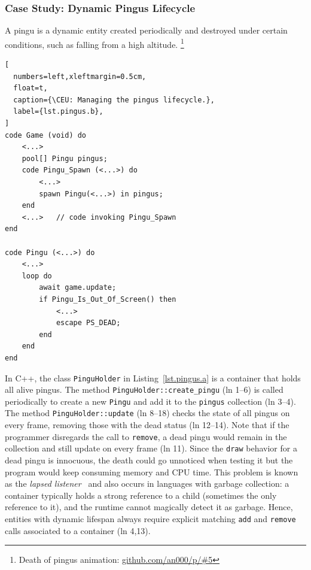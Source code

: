 \documentclass[10pt, conference, compsocconf]{IEEEtran}
\newcommand{\CEU}{\textsc{C\'{e}u}\xspace}
\newcommand{\code}[1] {{\small{\texttt{#1}}}}
\begin{document}
\subsubsection{Case Study: Dynamic Pingus Lifecycle}
\label{sec.pats.lifespan.2}


A pingu is a dynamic entity created periodically and destroyed under certain
conditions, such as falling from a high altitude.%
\footnote{Death of pingus animation: \url{github.com/an000/p/#5} }
%

\begin{lstlisting}[
  numbers=left,xleftmargin=0.5cm,
  float=t,
  caption={\CEU: Managing the pingus lifecycle.},
  label={lst.pingus.b},
]
code Game (void) do
    <...>
    pool[] Pingu pingus;
    code Pingu_Spawn (<...>) do
        <...>
        spawn Pingu(<...>) in pingus;
    end
    <...>   // code invoking Pingu_Spawn
end

code Pingu (<...>) do
    <...>
    loop do
        await game.update;
        if Pingu_Is_Out_Of_Screen() then
            <...>
            escape PS_DEAD;
        end
    end
end
\end{lstlisting}

In C++, the class \code{PinguHolder} in Listing~\ref{lst.pingus.a} is a
container that holds all alive pingus.
%
The method \code{PinguHolder::create\_pingu} (ln 1--6) is called periodically
to create a new \code{Pingu} and add it to the \code{pingus} collection
(ln 3--4).
The method \code{PinguHolder::update} (ln 8--18) checks the state of all
pingus on every frame, removing those with the dead status (ln 12--14).
%
Note that if the programmer disregards the call to \code{remove}, a dead pingu
would remain in the collection and still update on every frame (ln 11).
Since the \code{draw} behavior for a dead pingu is innocuous, the death could
go unnoticed when testing it but the program would keep consuming memory and
CPU time.
%
This problem is known as the \emph{lapsed listener}~\cite{games.patterns} and
also occurs in languages with garbage collection:
a container typically holds a strong reference to a child (sometimes the only 
reference to it), and the runtime cannot magically detect it as garbage.
%
Hence, entities with dynamic lifespan always require explicit matching
\code{add} and \code{remove} calls associated to a container (ln 4,13).
\end{document}

